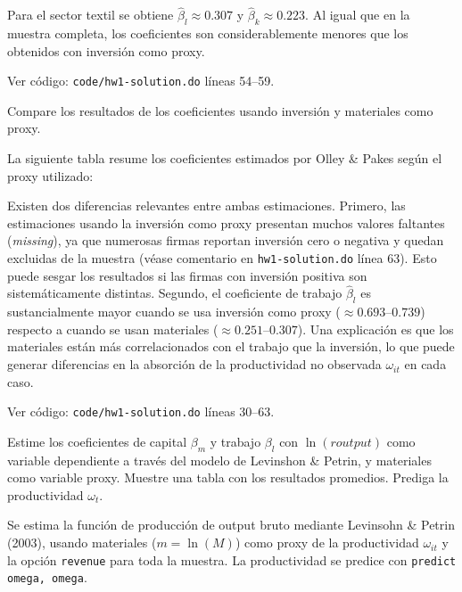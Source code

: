 \documentclass[answers]{exam}
\begin{document}
\begin{questions}
\begin{solution}


Para el sector textil se obtiene $\hat{\beta}_l \approx 0.307$ y $\hat{\beta}_k \approx 0.223$. Al igual que en la muestra completa, los coeficientes son considerablemente menores que los obtenidos con inversión como proxy.

Ver código: \texttt{code/hw1-solution.do} líneas 54--59.
\end{solution}

\question Compare los resultados de los coeficientes usando inversión y materiales como proxy.

\begin{solution}
La siguiente tabla resume los coeficientes estimados por Olley \& Pakes según el proxy utilizado:



Existen dos diferencias relevantes entre ambas estimaciones. Primero, las estimaciones usando la inversión como proxy presentan muchos valores faltantes (\textit{missing}), ya que numerosas firmas reportan inversión cero o negativa y quedan excluidas de la muestra (véase comentario en \texttt{hw1-solution.do} línea 63). Esto puede sesgar los resultados si las firmas con inversión positiva son sistemáticamente distintas. Segundo, el coeficiente de trabajo $\hat{\beta}_l$ es sustancialmente mayor cuando se usa inversión como proxy ($\approx 0.693$--$0.739$) respecto a cuando se usan materiales ($\approx 0.251$--$0.307$). Una explicación es que los materiales están más correlacionados con el trabajo que la inversión, lo que puede generar diferencias en la absorción de la productividad no observada $\omega_{it}$ en cada caso.

Ver código: \texttt{code/hw1-solution.do} líneas 30--63.
\end{solution}

\question Estime los coeficientes de capital $\beta_m$ y trabajo $\beta_l$ con $\ln(\mathit{routput})$ como variable dependiente a través del modelo de Levinshon \& Petrin, y materiales como variable proxy. Muestre una tabla con los resultados promedios. Prediga la productividad $\omega_t$.

\begin{solution}
Se estima la función de producción de output bruto mediante Levinsohn \& Petrin (2003), usando materiales ($m = \ln(M)$) como proxy de la productividad $\omega_{it}$ y la opción \texttt{revenue} para toda la muestra. La productividad se predice con \texttt{predict omega, omega}.


\end{solution}
\end{questions}
\end{document}

